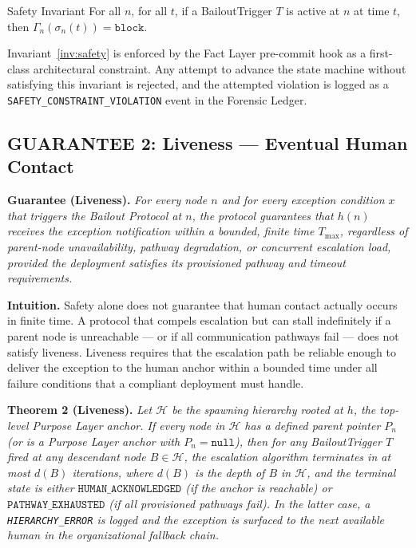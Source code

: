 \bigskip
\begin{invariant}{Safety Invariant}\label{inv:safety}
For all $n$, for all $t$, if a BailoutTrigger $T$ is active at $n$ at time $t$, then $\Gamma_n(\sigma_n(t)) = \texttt{block}$.
\end{invariant}

Invariant~\ref{inv:safety} is enforced by the Fact Layer pre-commit hook as a first-class architectural constraint. Any attempt to advance the state machine without satisfying this invariant is rejected, and the attempted violation is logged as a \texttt{SAFETY\_CONSTRAINT\_VIOLATION} event in the Forensic Ledger.

\subsection{GUARANTEE 2: Liveness — Eventual Human Contact}\label{sec:liveness}

\bigskip
\begin{minipage}{\linewidth}
\textbf{Guarantee (Liveness).} \textit{For every node $n$ and for every exception condition $x$ that triggers the Bailout Protocol at $n$, the protocol guarantees that $h(n)$ receives the exception notification within a bounded, finite time $T_{\max}$, regardless of parent-node unavailability, pathway degradation, or concurrent escalation load, provided the deployment satisfies its provisioned pathway and timeout requirements.}
\end{minipage}
\bigskip

\textbf{Intuition.} Safety alone does not guarantee that human contact actually occurs in finite time. A protocol that compels escalation but can stall indefinitely if a parent node is unreachable — or if all communication pathways fail — does not satisfy liveness. Liveness requires that the escalation path be reliable enough to deliver the exception to the human anchor within a bounded time under all failure conditions that a compliant deployment must handle.

\bigskip
\noindent\textbf{Theorem 2 (Liveness).}
\textit{Let $\mathcal{H}$ be the spawning hierarchy rooted at $h$, the top-level Purpose Layer anchor. If every node in $\mathcal{H}$ has a defined parent pointer $P_n$ (or is a Purpose Layer anchor with $P_n = \texttt{null}$), then for any BailoutTrigger $T$ fired at any descendant node $B \in \mathcal{H}$, the escalation algorithm terminates in at most $d(B)$ iterations, where $d(B)$ is the depth of $B$ in $\mathcal{H}$, and the terminal state is either $\texttt{HUMAN\_ACKNOWLEDGED}$ (if the anchor is reachable) or $\texttt{PATHWAY\_EXHAUSTED}$ (if all provisioned pathways fail). In the latter case, a \texttt{HIERARCHY\_ERROR} is logged and the exception is surfaced to the next available human in the organizational fallback chain.}

